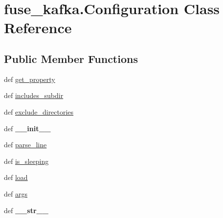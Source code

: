 \hypertarget{classfuse__kafka_1_1Configuration}{\section{fuse\-\_\-kafka.\-Configuration Class Reference}
\label{classfuse__kafka_1_1Configuration}
}
\subsection*{Public Member Functions}
\begin{DoxyCompactItemize}
\item 
def \hyperlink{classfuse__kafka_1_1Configuration_a962851606094dd5bc45ac8baa8fa0a16}{get\-\_\-property}
\item 
def \hyperlink{classfuse__kafka_1_1Configuration_aef5d3dda651dae8b01022f68900c2108}{includes\-\_\-subdir}
\item 
def \hyperlink{classfuse__kafka_1_1Configuration_ab13ba6dffdd3044c2200349628cd9c2b}{exclude\-\_\-directories}
\item 
\hypertarget{classfuse__kafka_1_1Configuration_ae3a1347719fa46a9431a8fb5164f3264}{def {\bfseries \-\_\-\-\_\-init\-\_\-\-\_\-}}\label{classfuse__kafka_1_1Configuration_ae3a1347719fa46a9431a8fb5164f3264}

\item 
def \hyperlink{classfuse__kafka_1_1Configuration_ab639bd7661a61dcc6faaba06966fa9ac}{parse\-\_\-line}
\item 
def \hyperlink{classfuse__kafka_1_1Configuration_a3c643a78420c5fbad7bb5dfd48718a6f}{is\-\_\-sleeping}
\item 
def \hyperlink{classfuse__kafka_1_1Configuration_acb3eac844331a816f9190441632951e1}{load}
\item 
def \hyperlink{classfuse__kafka_1_1Configuration_a63dba364a6a42dab38610389ab744124}{args}
\item 
\hypertarget{classfuse__kafka_1_1Configuration_a25a8f281fce858283ea4fcbac914f023}{def {\bfseries \-\_\-\-\_\-str\-\_\-\-\_\-}}\label{classfuse__kafka_1_1Configuration_a25a8f281fce858283ea4fcbac914f023}

\end{DoxyCompactItemize}
